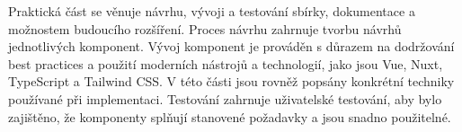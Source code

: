 Praktická část se věnuje návrhu, vývoji a testování sbírky, dokumentace a možnostem budoucího rozšíření. Proces návrhu zahrnuje tvorbu návrhů jednotlivých komponent. Vývoj komponent je prováděn s důrazem na dodržování best practices a použití moderních nástrojů a technologií, jako jsou Vue, Nuxt, TypeScript a Tailwind CSS. V této části jsou rovněž popsány konkrétní techniky používané při implementaci. Testování zahrnuje uživatelské testování, aby bylo zajištěno, že komponenty splňují stanovené požadavky a jsou snadno použitelné.
